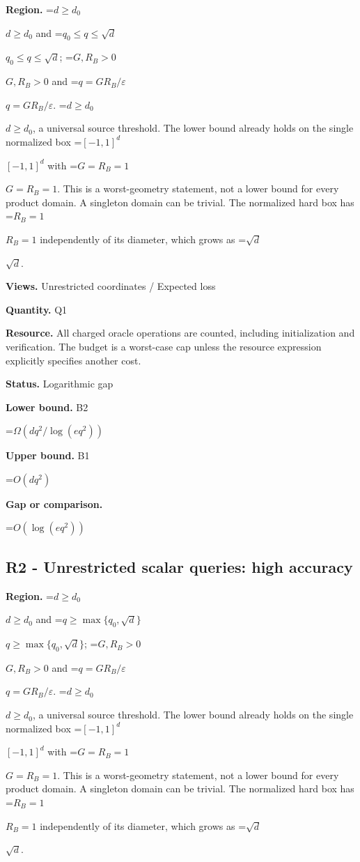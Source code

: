 \documentclass[10pt,a4paper]{article}
\newcommand{\AtlasMath}[1]{\par\begingroup\centering\setbox0=\hbox{$\displaystyle #1$}\ifdim\wd0>1.4\linewidth\typeout{ATLAS WIDE FORMULA: \the\wd0}\fi\ifdim\wd0>\linewidth\resizebox{\linewidth}{!}{\box0}\else\box0\fi\par\endgroup}
\newcommand{\AtlasInlineMath}[1]{\begingroup\setbox0=\hbox{$#1$}\ifdim\wd0>.4\linewidth\endgroup\AtlasMath{#1}\else\endgroup$#1$\fi}
\begin{document}
\textbf{Region.} \AtlasInlineMath{d\ge d_0} and \AtlasInlineMath{q_0\le q\le\sqrt d}; \AtlasInlineMath{G,R_B>0} and \AtlasInlineMath{q=GR_B/\varepsilon}. \AtlasInlineMath{d\ge d_0}, a universal source threshold. The lower bound already holds on the single normalized box \AtlasInlineMath{[-1,1]^d} with \AtlasInlineMath{G=R_B=1}. This is a worst-geometry statement, not a lower bound for every product domain. A singleton domain can be trivial. The normalized hard box has \AtlasInlineMath{R_B=1} independently of its diameter, which grows as \AtlasInlineMath{\sqrt d}.



\textbf{Views.} Unrestricted coordinates / Expected loss



\textbf{Quantity.} Q1



\textbf{Resource.} All charged oracle operations are counted, including initialization and verification. The budget is a worst-case cap unless the resource expression explicitly specifies another cost.



\textbf{Status.} Logarithmic gap



\textbf{Lower bound.} B2



\AtlasMath{\Omega(dq^2/\log(eq^2))}


\textbf{Upper bound.} B1



\AtlasMath{O(dq^2)}


\textbf{Gap or comparison.}



\AtlasMath{O(\log(eq^2))}


\subsection{R2 - Unrestricted scalar queries: high accuracy}


\textbf{Region.} \AtlasInlineMath{d\ge d_0} and \AtlasInlineMath{q\ge\max\{q_0,\sqrt d\}}; \AtlasInlineMath{G,R_B>0} and \AtlasInlineMath{q=GR_B/\varepsilon}. \AtlasInlineMath{d\ge d_0}, a universal source threshold. The lower bound already holds on the single normalized box \AtlasInlineMath{[-1,1]^d} with \AtlasInlineMath{G=R_B=1}. This is a worst-geometry statement, not a lower bound for every product domain. A singleton domain can be trivial. The normalized hard box has \AtlasInlineMath{R_B=1} independently of its diameter, which grows as \AtlasInlineMath{\sqrt d}.
\end{document}
